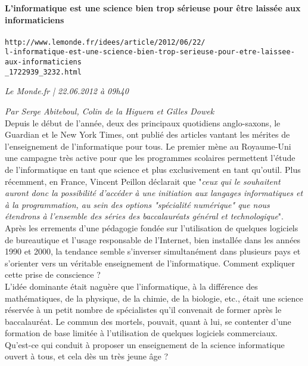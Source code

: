 \documentclass[11pt,twoside,a4paper]{article}
\begin{document}
\setlength\parindent{0pt}

\vfill

\begin{center}
	\textbf{\Large L'informatique est une science bien trop s{\'e}rieuse pour {\^e}tre laiss{\'e}e aux informaticiens}~\\
	~\\
	\texttt{http://www.lemonde.fr/idees/article/2012/06/22/~\\ l-informatique-est-une-science-bien-trop-serieuse-pour-etre-laissee-aux-informaticiens~\\ \_1722939\_3232.html}
\end{center}

\vfill

\begin{multicols}{2}
	\footnotesize
	
	\emph{\small Le Monde.fr | 22.06.2012 {\`a} 09h40} %

	\emph{\small Par Serge Abiteboul, Colin de la Higuera et Gilles Dowek}~\\

	Depuis le d{\'e}but de l'ann{\'e}e, deux des principaux quotidiens anglo-saxons, le Guardian et le New York Times, ont publi{\'e} des articles vantant les m{\'e}rites de l'enseignement de l'informatique pour tous. Le premier m{\`e}ne au Royaume-Uni une campagne tr{\`e}s active pour que les programmes scolaires permettent l'{\'e}tude de l'informatique en tant que science et plus exclusivement en tant qu'outil. Plus r{\'e}cemment, en France, Vincent Peillon d{\'e}clarait que "\emph{ceux qui le souhaitent auront donc la possibilit{\'e} d'acc{\'e}der {\`a} une initiation aux langages informatiques et {\`a} la programmation, au sein des options "sp{\'e}cialit{\'e} num{\'e}rique" que nous {\'e}tendrons {\`a} l'ensemble des s{\'e}ries des baccalaur{\'e}ats g{\'e}n{\'e}ral et technologique}".~\\
	
	Apr{\`e}s les errements d'une p{\'e}dagogie fond{\'e}e sur l'utilisation de quelques logiciels de bureautique et l'usage responsable de l'Internet, bien install{\'e}e dans les ann{\'e}es 1990 et 2000, la tendance semble s'inverser simultan{\'e}ment dans plusieurs pays et s'orienter vers un v{\'e}ritable enseignement de l'informatique. Comment expliquer cette prise de conscience ?~\\
	
	L'id{\'e}e dominante {\'e}tait nagu{\`e}re que l'informatique, {\`a} la diff{\'e}rence des math{\'e}matiques, de la physique, de la chimie, de la biologie, etc., {\'e}tait une science r{\'e}serv{\'e}e {\`a} un petit nombre de sp{\'e}cialistes qu'il convenait de former apr{\`e}s le baccalaur{\'e}at. Le commun des mortels, pouvait, quant {\`a} lui, se contenter d'une formation de base limit{\'e}e {\`a} l'utilisation de quelques logiciels commerciaux. Qu'est-ce qui conduit {\`a} proposer un enseignement de la science informatique ouvert {\`a} tous, et cela d{\`e}s un tr{\`e}s jeune {\^a}ge ?~\\
	

\end{multicols}
\end{document}
